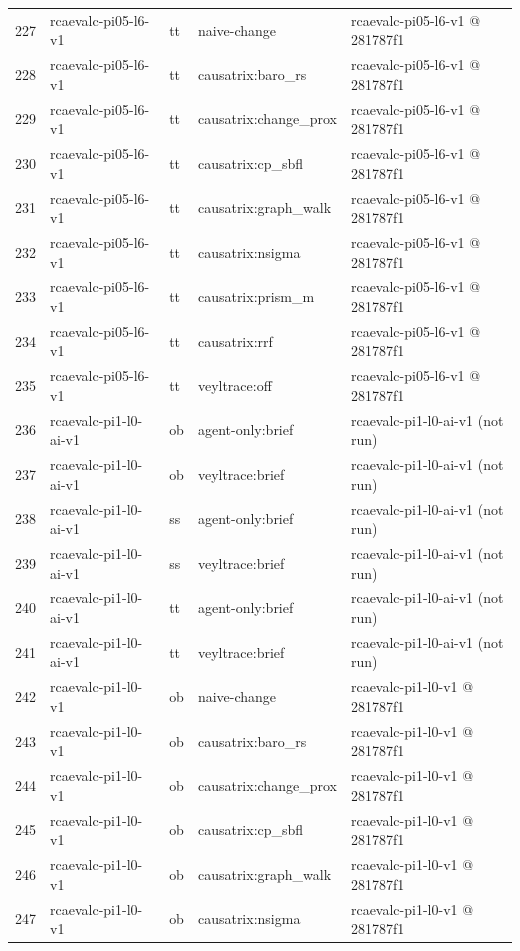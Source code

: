 \begin{longtable}{@{}r>{\raggedright\arraybackslash}p{87.0pt}>{\raggedright\arraybackslash}p{18.0pt}>{\raggedright\arraybackslash}p{63.0pt}>{\raggedright\arraybackslash}p{108.0pt}@{}}
227 & rcaevalc-pi05-l6-v1 & tt & naive-change & rcaevalc-pi05-l6-v1 @ 281787f1 \\
228 & rcaevalc-pi05-l6-v1 & tt & causatrix:baro\_rs & rcaevalc-pi05-l6-v1 @ 281787f1 \\
229 & rcaevalc-pi05-l6-v1 & tt & causatrix:change\_prox & rcaevalc-pi05-l6-v1 @ 281787f1 \\
230 & rcaevalc-pi05-l6-v1 & tt & causatrix:cp\_sbfl & rcaevalc-pi05-l6-v1 @ 281787f1 \\
231 & rcaevalc-pi05-l6-v1 & tt & causatrix:graph\_walk & rcaevalc-pi05-l6-v1 @ 281787f1 \\
232 & rcaevalc-pi05-l6-v1 & tt & causatrix:nsigma & rcaevalc-pi05-l6-v1 @ 281787f1 \\
233 & rcaevalc-pi05-l6-v1 & tt & causatrix:prism\_m & rcaevalc-pi05-l6-v1 @ 281787f1 \\
234 & rcaevalc-pi05-l6-v1 & tt & causatrix:rrf & rcaevalc-pi05-l6-v1 @ 281787f1 \\
235 & rcaevalc-pi05-l6-v1 & tt & veyltrace:off & rcaevalc-pi05-l6-v1 @ 281787f1 \\
236 & rcaevalc-pi1-l0-ai-v1 & ob & agent-only:brief & rcaevalc-pi1-l0-ai-v1 (not run) \\
237 & rcaevalc-pi1-l0-ai-v1 & ob & veyltrace:brief & rcaevalc-pi1-l0-ai-v1 (not run) \\
238 & rcaevalc-pi1-l0-ai-v1 & ss & agent-only:brief & rcaevalc-pi1-l0-ai-v1 (not run) \\
239 & rcaevalc-pi1-l0-ai-v1 & ss & veyltrace:brief & rcaevalc-pi1-l0-ai-v1 (not run) \\
240 & rcaevalc-pi1-l0-ai-v1 & tt & agent-only:brief & rcaevalc-pi1-l0-ai-v1 (not run) \\
241 & rcaevalc-pi1-l0-ai-v1 & tt & veyltrace:brief & rcaevalc-pi1-l0-ai-v1 (not run) \\
242 & rcaevalc-pi1-l0-v1 & ob & naive-change & rcaevalc-pi1-l0-v1 @ 281787f1 \\
243 & rcaevalc-pi1-l0-v1 & ob & causatrix:baro\_rs & rcaevalc-pi1-l0-v1 @ 281787f1 \\
244 & rcaevalc-pi1-l0-v1 & ob & causatrix:change\_prox & rcaevalc-pi1-l0-v1 @ 281787f1 \\
245 & rcaevalc-pi1-l0-v1 & ob & causatrix:cp\_sbfl & rcaevalc-pi1-l0-v1 @ 281787f1 \\
246 & rcaevalc-pi1-l0-v1 & ob & causatrix:graph\_walk & rcaevalc-pi1-l0-v1 @ 281787f1 \\
247 & rcaevalc-pi1-l0-v1 & ob & causatrix:nsigma & rcaevalc-pi1-l0-v1 @ 281787f1 \\

\end{longtable}
